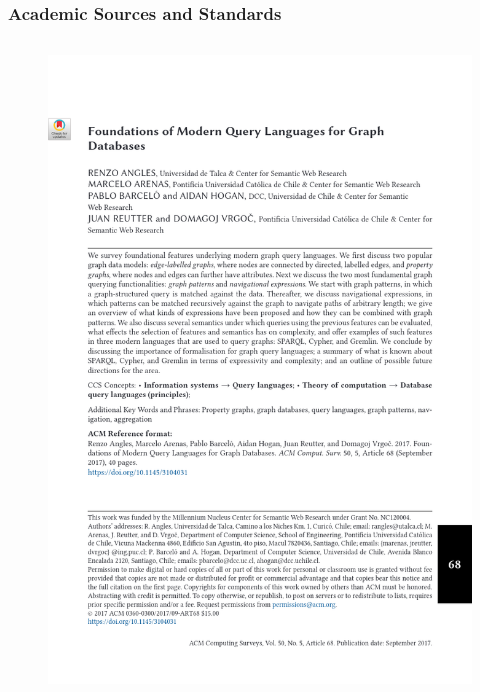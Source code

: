 \documentclass[
	aspectratio=169,
	compress,
]{beamer}
\newcommand{\navframetitle}[1]{\frametitle{#1\hfill{\footnotesize\lastsection{}}}}
\begin{document}
\begin{frame}
	\navframetitle{Academic Sources and Standards}
    \vspace{-1em}
	\begin{columns}[T]
		\begin{column}{0.3\textwidth}
            \begin{figure}
                \caption{\cite{FoundationsOfModernQueryLanguages}}
                \begin{center}
                    \includegraphics[width=\textwidth]{./figures/foundationOfModernQueryLanguages.png}
                \end{center}
            \end{figure}
        \end{column}

\end{columns}
\end{frame}
\end{document}
